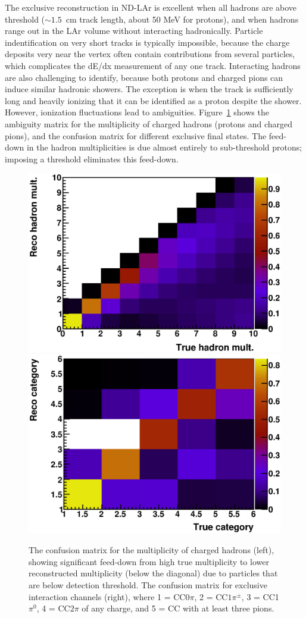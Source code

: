 \documentclass[11pt]{article}
\begin{document}
The exclusive reconstruction in ND-LAr is excellent when all hadrons are above threshold ($\sim 1.5$~cm track length, about 50 MeV for protons), and when hadrons range out in the LAr volume without interacting hadronically. Particle indentification on very short tracks is typically impossible, because the charge deposits very near the vertex often contain contributions from several particles, which complicates the dE/dx measurement of any one track. Interacting hadrons are also challenging to identify, because both protons and charged pions can induce similar hadronic showers. The exception is when the track is sufficiently long and heavily ionizing that it can be identified as a proton despite the shower. However, ionization fluctuations lead to ambiguities. Figure~\ref{fig:lar_matrices} shows the ambiguity matrix for the multiplicity of charged hadrons (protons and charged pions), and the confusion matrix for different exclusive final states. The feed-down in the hadron multiplicities is due almost entirely to sub-threshold protons; imposing a threshold eliminates this feed-down.

\begin{figure}[h]
\centering
\includegraphics[width=0.45\columnwidth]{graphics/hadMult_matrix_colNorm.eps}
\includegraphics[width=0.45\columnwidth]{graphics/confusion_matrix_colNorm.eps}
\caption{The confusion matrix for the multiplicity of charged hadrons (left), showing significant feed-down from high true multiplicity to lower reconstructed multiplicity (below the diagonal) due to particles that are below detection threshold. The confusion matrix for exclusive interaction channels (right), where 1 = CC$0\pi$, 2 = CC$1\pi^{\pm}$, 3 = CC1$\pi^{0}$, 4 = CC$2\pi$ of any charge, and 5 = CC with at least three pions.}
\label{fig:lar_matrices}
\end{figure}
\end{document}
